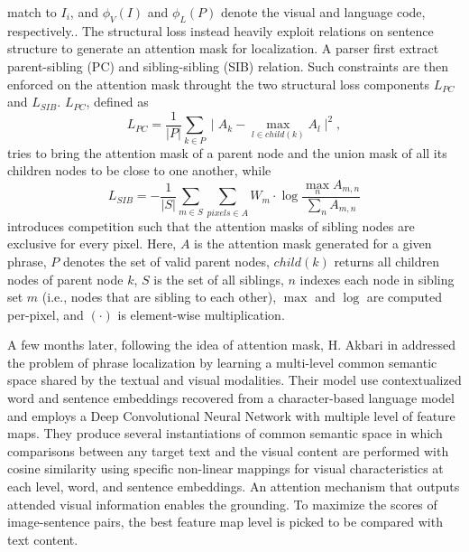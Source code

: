 match to $I_i$, and $\phi_V(I)$ and $\phi_L(P)$ denote the visual and
language code, respectively.. The structural loss instead heavily
exploit relations on sentence structure to generate an attention mask
for localization. A parser first extract parent-sibling (PC) and
sibling-sibling (SIB) relation. Such constraints are then enforced on
the attention mask throught the two structural loss components
$L_{PC}$ and $L_{SIB}$. $L_{PC}$, defined as 
\begin{equation}
  L_{PC} = \frac{1}{|P|} \sum_{k \in P} \mid A_k - \max_{l \in child(k)} A_l \mid ^ 2,
\end{equation}
tries to bring the attention mask of a parent node and the union mask
of all its children nodes to be close to one another, while
\begin{equation}
  L_{SIB} = - \frac{1}{|S|} \sum_{m \in S} \sum_{pixels \in A} W_m \cdot \log \frac{\max_n A_{m,n}}{\sum_n A_{m,n}}
\end{equation}
introduces competition such that the attention masks of sibling nodes
are exclusive for every pixel. Here, $A$ is the attention mask
generated for a given phrase, $P$ denotes the set of valid parent
nodes, $child(k)$ returns all children nodes of parent node $k$, $S$
is the set of all siblings, $n$ indexes each node in sibling set $m$
(i.e., nodes that are sibling to each other), $\max$ and $\log$ are
computed per-pixel, and $(\cdot)$ is element-wise multiplication.

A few months later, following the idea of attention mask, H. Akbari
\etal{} in \cite{akbari2019multi} addressed the problem of phrase
localization by learning a multi-level common semantic space shared by
the textual and visual modalities. Their model use contextualized word
and sentence embeddings recovered from a character-based language
model and employs a Deep Convolutional Neural Network with multiple
level of feature maps. They produce several instantiations of common
semantic space in which comparisons between any target text and the
visual content are performed with cosine similarity using specific
non-linear mappings for visual characteristics at each level, word,
and sentence embeddings. An attention mechanism that outputs attended
visual information enables the grounding. To maximize the scores of
image-sentence pairs, the best feature map level is picked to be
compared with text content.

